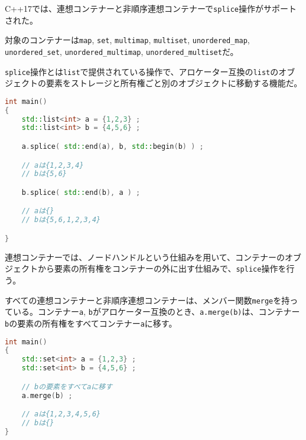 %

C++17では、連想コンテナーと非順序連想コンテナーで\lstinline!splice!操作がサポートされた。

対象のコンテナーは\lstinline!map!, \lstinline!set!,
\lstinline!multimap!, \lstinline!multiset!, \lstinline!unordered_map!,
\lstinline!unordered_set!, \lstinline!unordered_multimap!,
\lstinline!unordered_multiset!だ。

\lstinline!splice!操作とは\lstinline!list!で提供されている操作で、アロケーター互換の\lstinline!list!のオブジェクトの要素をストレージと所有権ごと別のオブジェクトに移動する機能だ。

\begin{lstlisting}[language=C++]
int main()
{
    std::list<int> a = {1,2,3} ;
    std::list<int> b = {4,5,6} ;

    a.splice( std::end(a), b, std::begin(b) ) ;

    // aは{1,2,3,4}
    // bは{5,6}

    b.splice( std::end(b), a ) ;

    // aは{}
    // bは{5,6,1,2,3,4}

}
\end{lstlisting}

連想コンテナーでは、ノードハンドルという仕組みを用いて、コンテナーのオブジェクトから要素の所有権をコンテナーの外に出す仕組みで、\lstinline!splice!操作を行う。

%

すべての連想コンテナーと非順序連想コンテナーは、メンバー関数\lstinline!merge!を持っている。コンテナー\lstinline!a!,
\lstinline!b!がアロケーター互換のとき、\lstinline!a.merge(b)!は、コンテナー\lstinline!b!の要素の所有権をすべてコンテナー\lstinline!a!に移す。

\begin{lstlisting}[language=C++]
int main()
{
    std::set<int> a = {1,2,3} ;
    std::set<int> b = {4,5,6} ;

    // bの要素をすべてaに移す
    a.merge(b) ;

    // aは{1,2,3,4,5,6}
    // bは{}
}
\end{lstlisting}

